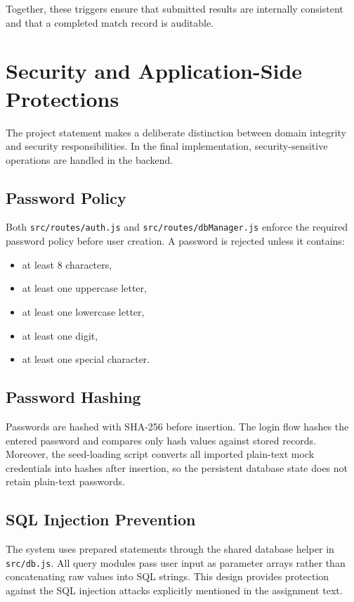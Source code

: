 \documentclass[12pt,a4paper]{article}
\begin{document}
Together, these triggers ensure that submitted results are internally consistent and that a completed match record is auditable.

\section{Security and Application-Side Protections}
The project statement makes a deliberate distinction between domain integrity and security responsibilities. In the final implementation, security-sensitive operations are handled in the backend.

\subsection{Password Policy}
Both \texttt{src/routes/auth.js} and \texttt{src/routes/dbManager.js} enforce the required password policy before user creation. A password is rejected unless it contains:
\begin{itemize}
    \item at least 8 characters,
    \item at least one uppercase letter,
    \item at least one lowercase letter,
    \item at least one digit,
    \item at least one special character.
\end{itemize}

\subsection{Password Hashing}
Passwords are hashed with SHA-256 before insertion. The login flow hashes the entered password and compares only hash values against stored records. Moreover, the seed-loading script converts all imported plain-text mock credentials into hashes after insertion, so the persistent database state does not retain plain-text passwords.

\subsection{SQL Injection Prevention}
The system uses prepared statements through the shared database helper in \texttt{src/db.js}. All query modules pass user input as parameter arrays rather than concatenating raw values into SQL strings. This design provides protection against the SQL injection attacks explicitly mentioned in the assignment text.
\end{document}
